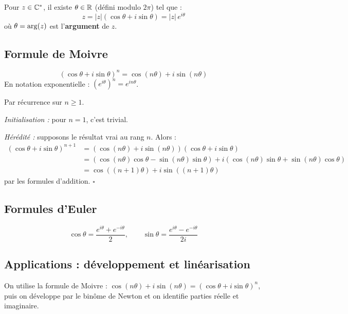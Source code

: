 \begin{defbox}
Pour $z \in \mathbb{C}^*$, il existe $\theta \in \mathbb{R}$ (défini modulo $2\pi$) tel que :
\[
  z = |z|(\cos\theta + i\sin\theta) = |z| \, e^{i\theta}
\]
où $\theta = \operatorname{arg}(z)$ est l'\textbf{argument} de $z$.
\end{defbox}

\subsection{Formule de Moivre}

\begin{thmbox}
\[
  (\cos\theta + i\sin\theta)^n = \cos(n\theta) + i\sin(n\theta)
\]
En notation exponentielle : $(e^{i\theta})^n = e^{in\theta}$.
\end{thmbox}

\begin{proofbox}
Par récurrence sur $n \geqslant 1$.

\textit{Initialisation :} pour $n = 1$, c'est trivial.

\textit{Hérédité :} supposons le résultat vrai au rang $n$. Alors :
\begin{align*}
  (\cos\theta + i\sin\theta)^{n+1} &= (\cos(n\theta) + i\sin(n\theta))(\cos\theta + i\sin\theta) \\
  &= (\cos(n\theta)\cos\theta - \sin(n\theta)\sin\theta) + i(\cos(n\theta)\sin\theta + \sin(n\theta)\cos\theta) \\
  &= \cos((n+1)\theta) + i\sin((n+1)\theta)
\end{align*}
par les formules d'addition. \hfill$\square$
\end{proofbox}

\subsection{Formules d'Euler}

\begin{propbox}
\[
  \cos\theta = \frac{e^{i\theta} + e^{-i\theta}}{2}, \qquad \sin\theta = \frac{e^{i\theta} - e^{-i\theta}}{2i}
\]
\end{propbox}

\subsection{Applications : développement et linéarisation}

\begin{methodbox}
On utilise la formule de Moivre : $\cos(n\theta) + i\sin(n\theta) = (\cos\theta + i\sin\theta)^n$, puis on développe par le binôme de Newton et on identifie parties réelle et imaginaire.
\end{methodbox}

